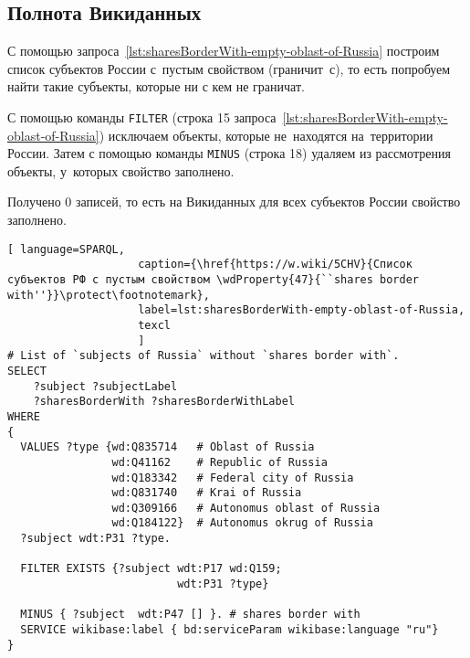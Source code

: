 \newpage
\subsection{Полнота Викиданных}

С помощью запроса~\ref{lst:sharesBorderWith-empty-oblast-of-Russia} 
построим список субъектов России 
с~пустым свойством  (граничит~с), 
то есть попробуем найти такие субъекты, которые ни с кем не граничат.



С помощью команды \lstinline|FILTER| (строка 15 запроса~\ref{lst:sharesBorderWith-empty-oblast-of-Russia}) 
исключаем объекты, которые не~находятся на~территории России. 
Затем с помощью команды \lstinline|MINUS| (строка 18) удаляем из рассмотрения объекты, 
у~которых свойство  заполнено.

Получено 0 записей, то есть на Викиданных для всех субъектов России свойство  заполнено.

\lstset{numbers=left, firstnumber=1, frame=single}
\begin{lstlisting}[ language=SPARQL, 
                    caption={\href{https://w.wiki/5CHV}{Список субъектов РФ с пустым свойством \wdProperty{47}{``shares border with''}}\protect\footnotemark},
                    label=lst:sharesBorderWith-empty-oblast-of-Russia,
                    texcl 
                    ]
# List of `subjects of Russia` without `shares border with`. 
SELECT 
    ?subject ?subjectLabel 
    ?sharesBorderWith ?sharesBorderWithLabel
WHERE
{
  VALUES ?type {wd:Q835714   # Oblast of Russia
                wd:Q41162    # Republic of Russia
                wd:Q183342   # Federal city of Russia
                wd:Q831740   # Krai of Russia
                wd:Q309166   # Autonomus oblast of Russia
                wd:Q184122}  # Autonomus okrug of Russia
  ?subject wdt:P31 ?type.
  
  FILTER EXISTS {?subject wdt:P17 wd:Q159; 
                          wdt:P31 ?type}
  
  MINUS { ?subject  wdt:P47 [] }. # shares border with 
  SERVICE wikibase:label { bd:serviceParam wikibase:language "ru"}
}
\end{lstlisting}%



